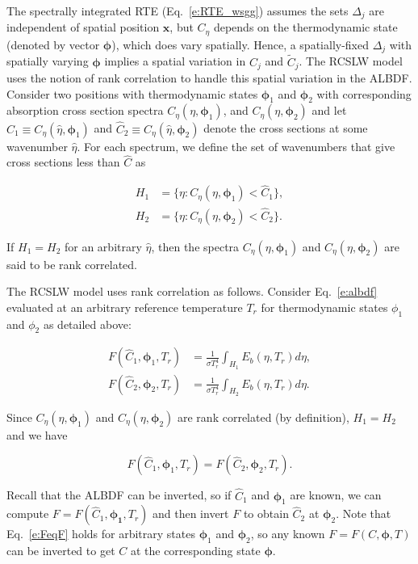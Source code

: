 \documentclass[preprint,12pt]{elsarticle}
\newcommand{\BS}{\boldsymbol}
\begin{document}
The spectrally integrated RTE (Eq.~\ref{e:RTE_wsgg}) assumes the sets $\Delta_j$ are independent of spatial position $\mathbf{x}$, but $C_\eta$ depends on the thermodynamic state (denoted by vector $\BS{\phi}$), which does vary spatially.
Hence, a spatially-fixed $\Delta_j$ with spatially varying $\BS{\phi}$ implies a spatial variation in $C_j$ and $\tilde{C}_j$. 
The RCSLW model uses the notion of rank correlation to handle  this spatial variation in the ALBDF. 
Consider two positions with thermodynamic states $\BS{\phi}_1$ and $\BS{\phi}_2$ with corresponding absorption cross section spectra $C_\eta(\eta,\BS{\phi}_1)$, and $C_\eta(\eta,\BS{\phi}_2)$ and let $\hat{C}_1\equiv C_\eta(\hat{\eta},\BS{\phi}_1)$ and $\hat{C}_2\equiv C_\eta(\hat{\eta},\BS{\phi}_2)$ denote the cross sections at some wavenumber $\hat{\eta}$. For each spectrum, we define the set of wavenumbers that give cross sections less than $\hat{C}$ as
%
\begin{linenomath}
\begin{align}
    H_1&=\{\eta: C_\eta(\eta,\BS{\phi}_1)<\hat{C}_1\}, \\
    H_2&=\{\eta: C_\eta(\eta,\BS{\phi}_2)<\hat{C}_2\}.
    \end{align}
\end{linenomath}
%
If $H_1=H_2$ for an arbitrary $\hat{\eta}$, then the spectra $C_\eta(\eta,\BS{\phi}_1)$ and $C_\eta(\eta,\BS{\phi}_2)$ are said to be rank correlated.

The RCSLW model uses rank correlation as follows.
Consider Eq.~\ref{e:albdf} evaluated at an arbitrary reference temperature $T_r$ for thermodynamic states $\phi_1$ and $\phi_2$ as detailed above:
%
\begin{linenomath}
    \begin{align} \label{e:albdf2}
        F(\hat{C}_1,\BS{\phi}_1,T_r) &= \frac{1}{\sigma T_r^4}\int_{H_1}E_b(\eta,T_r)d\eta, \\
        F(\hat{C}_2,\BS{\phi}_2,T_r) &= \frac{1}{\sigma T_r^4}\int_{H_2}E_b(\eta,T_r)d\eta.
    \end{align}
\end{linenomath}
%
Since $C_\eta(\eta,\BS{\phi}_1)$ and $C_\eta(\eta,\BS{\phi}_2)$ are rank correlated (by definition), $H_1=H_2$ and we have 
%
\begin{linenomath}
    \begin{equation}\label{e:FeqF}
    F(\hat{C}_1,\BS{\phi}_1,T_r)=F(\hat{C}_2,\BS{\phi}_2,T_r).
\end{equation}
\end{linenomath}
%
Recall that the ALBDF can be inverted, so if $\hat{C}_1$ and $\BS{\phi}_1$ are known, we can compute $F=F(\hat{C}_1,\BS{\phi_1},T_r)$ and then invert $F$ to obtain $\hat{C}_2$ at $\BS{\phi}_2$. Note that Eq.~\ref{e:FeqF} holds for arbitrary states $\BS{\phi}_1$ and $\BS{\phi}_2$, so any known $F=F(C,\BS{\phi},T)$ can be inverted to get $C$ at the corresponding state $\BS{\phi}$. 
\end{document}
